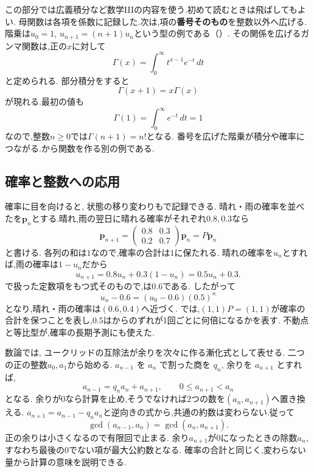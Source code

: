 この部分では広義積分など数学IIIの内容を使う.初めて読むときは飛ばしてもよい.
母関数は各項を係数に記録した.次は,項の\textbf{番号そのもの}を整数以外へ広げる.
階乗は$u_0=1$, $u_{n+1}=(n+1)u_n$という型の例である（）.
その関係を広げるガンマ関数は,正の$x$に対して
\[
  \Gamma(x)=\int_0^\infty t^{x-1}e^{-t}\,dt
\]
と定められる.
部分積分をすると
\[
  \Gamma(x+1)=x\Gamma(x)
\]
が現れる.最初の値も
\[
  \Gamma(1)=\int_0^\infty e^{-t}\,dt=1
\]
なので,整数$n\ge0$では$\Gamma(n+1)=n!$となる.
番号を広げた階乗が積分や確率につながる.から関数を作る別の例である.

\subsection{確率と整数への応用}
確率に目を向けると, 状態の移り変わりもで記録できる.
晴れ・雨の確率を並べたを$\boldsymbol p_n$とする.晴れ,雨の翌日に晴れる確率がそれぞれ$0.8,0.3$なら
\[
  \boldsymbol p_{n+1}
  =
  \begin{pmatrix}0.8&0.3\\0.2&0.7\end{pmatrix}
  \boldsymbol p_n
  =P\boldsymbol p_n
\]
と書ける.
各列の和は$1$なので,確率の合計は$1$に保たれる.
晴れの確率を$u_n$とすれば,雨の確率は$1-u_n$だから
\[
  u_{n+1}=0.8u_n+0.3(1-u_n)=0.5u_n+0.3.
\]
で扱った定数項をもつ式そのもので,は$0.6$である.
したがって
\[
  u_n-0.6=(u_0-0.6)(0.5)^n
\]
となり,晴れ・雨の確率は$(0.6,0.4)$へ近づく.
では,$(1,1)P=(1,1)$が確率の合計を保つことを表し,$0.5$はからのずれが1回ごとに何倍になるかを表す.
不動点と等比型が,確率の長期予測にも使えた.

数論では, ユークリッドの互除法が余りを次々に作る漸化式として表せる.
二つの正の整数$a_0,a_1$から始める.
$a_{n-1}$ を $a_n$ で割った商を $q_n$, 余りを $a_{n+1}$ とすれば,
\[
  a_{n-1}=q_na_n+a_{n+1},
  \qquad 0\le a_{n+1}<a_n
\]
となる.
余りが0なら計算を止め,そうでなければ2つの数を$(a_n,a_{n+1})$へ置き換える.
$a_{n+1}=a_{n-1}-q_na_n$と逆向きの式から,共通の約数は変わらない.従って
\[
  \gcd(a_{n-1},a_n)=\gcd(a_n,a_{n+1}).
\]
正の余りは小さくなるので有限回で止まる.
余り$a_{n+1}$が$0$になったときの除数$a_n$,すなわち最後の0でない項が最大公約数となる.
確率の合計と同じく,変わらない量から計算の意味を説明できる.

